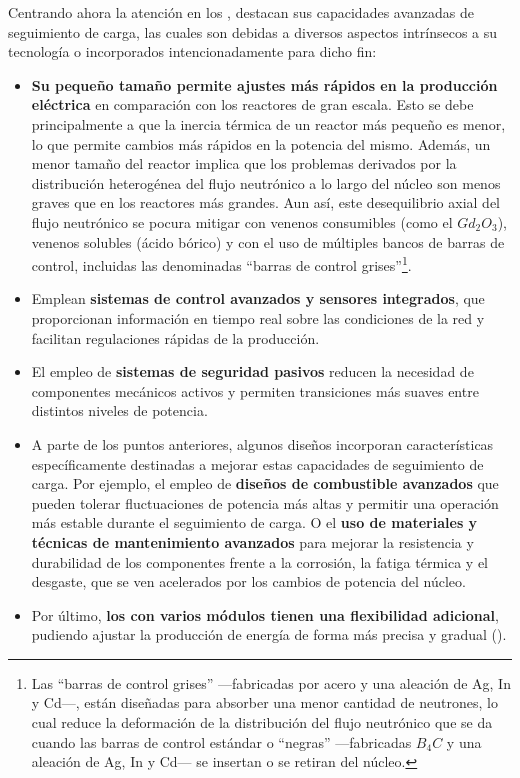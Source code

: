 Centrando ahora la atención en los , destacan sus capacidades avanzadas de seguimiento de carga, las cuales son debidas a diversos aspectos intrínsecos a su tecnología o incorporados intencionadamente para dicho fin:
\begin{itemize}
  \item \textbf{Su pequeño tamaño permite ajustes más rápidos en la producción eléctrica} en comparación con los reactores de gran escala. Esto se debe principalmente a que la inercia térmica de un reactor más pequeño es menor, lo que permite cambios más rápidos en la potencia del mismo. Además, un menor tamaño del reactor implica que los problemas derivados por la distribución heterogénea del flujo neutrónico a lo largo del núcleo son menos graves que en los reactores más grandes. Aun así, este desequilibrio axial del flujo neutrónico se pocura mitigar con venenos consumibles (como el $Gd_2O_3$), venenos solubles (ácido bórico) y con el uso de múltiples bancos de barras de control, incluidas las denominadas ``barras de control grises''\footnote{Las ``barras de control grises'' ---fabricadas por acero y una aleación de Ag, In y Cd---, están diseñadas para absorber una menor cantidad de neutrones, lo cual reduce la deformación de la distribución del flujo neutrónico que se da cuando las barras de control estándar o ``negras'' ---fabricadas $B_4C$ y una aleación de Ag, In y Cd--- se insertan o se retiran del núcleo.}.
  \item Emplean \textbf{sistemas de control avanzados y sensores integrados}, que proporcionan información en tiempo real sobre las condiciones de la red y facilitan regulaciones rápidas de la producción.
  \item El empleo de \textbf{sistemas de seguridad pasivos} reducen la necesidad de componentes mecánicos activos y permiten transiciones más suaves entre distintos niveles de potencia.
  \item A parte de los puntos anteriores, algunos diseños incorporan características específicamente destinadas a mejorar estas capacidades de seguimiento de carga. Por ejemplo, el empleo de \textbf{diseños de combustible avanzados} que pueden tolerar fluctuaciones de potencia más altas y permitir una operación más estable durante el seguimiento de carga. O el \textbf{uso de materiales y técnicas de mantenimiento avanzados} para mejorar la resistencia y durabilidad de los componentes frente a la corrosión, la fatiga térmica y el desgaste, que se ven acelerados por los cambios de potencia del núcleo.
  \item Por último, \textbf{los  con varios módulos tienen una flexibilidad adicional}, pudiendo ajustar la producción de energía de forma más precisa y gradual (\cite{smr_load_following_capabilities}).
\end{itemize}

